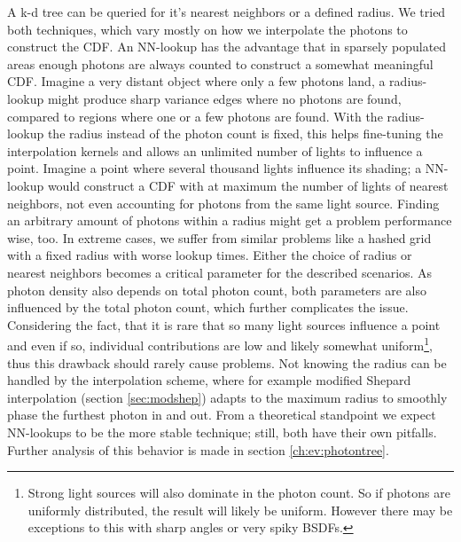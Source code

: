 A k-d tree can be queried for it's nearest neighbors or a defined radius. We tried both techniques, which vary mostly on how we interpolate the photons to construct the CDF. An NN-lookup has the advantage that in sparsely populated areas enough photons are always counted to construct a somewhat meaningful CDF. Imagine a very distant object where only a few photons land, a radius-lookup might produce sharp variance edges where no photons are found, compared to regions where one or a few photons are found. With the radius-lookup the radius instead of the photon count is fixed, this helps fine-tuning the interpolation kernels and allows an unlimited number of lights to influence a point. Imagine a point where several thousand lights influence its shading; a NN-lookup would construct a CDF with at maximum the number of lights of nearest neighbors, not even accounting for photons from the same light source. Finding an arbitrary amount of photons within a radius might get a problem performance wise, too. In extreme cases, we suffer from similar problems like a hashed grid with a fixed radius with worse lookup times. Either the choice of radius or nearest neighbors becomes a critical parameter for the described scenarios. As photon density also depends on total photon count, both parameters are also influenced by the total photon count, which further complicates the issue. Considering the fact, that it is rare that so many light sources influence a point and even if so, individual contributions are low and likely somewhat uniform\footnote{Strong light sources will also dominate in the photon count. So if photons are uniformly distributed, the result will likely be uniform. However there may be exceptions to this with sharp angles or very spiky BSDFs.}, thus this drawback should rarely cause problems. Not knowing the radius can be handled by the interpolation scheme, where for example modified Shepard interpolation (section \ref{sec:modshep}) adapts to the maximum radius to smoothly phase the furthest photon in and out. From a theoretical standpoint we expect NN-lookups to be the more stable technique; still, both have their own pitfalls. Further analysis of this behavior is made in section \ref{ch:ev:photontree}.

